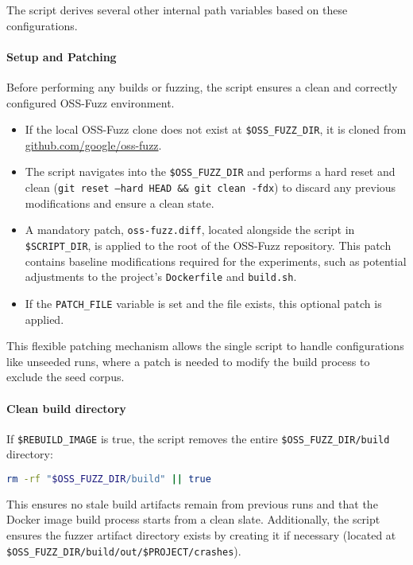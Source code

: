 \documentclass[11pt,a4paper,twocolumn]{article}
\begin{document}
The script derives several other internal path variables based on these configurations.

\noindent \paragraph{Setup and Patching} \label{sec:methodology_setup_patching}

Before performing any builds or fuzzing, the script ensures a clean and correctly configured OSS-Fuzz environment.

\begin{itemize}
	\item If the local OSS-Fuzz clone does not exist at \texttt{\$OSS\_FUZZ\_DIR}, it is cloned from \href{https://github.com/google/oss-fuzz.git}{github.com/google/oss-fuzz}.
	\item The script navigates into the \texttt{\$OSS\_FUZZ\_DIR} and performs a hard reset and clean (\texttt{git reset --hard HEAD \&\& git clean -fdx}) to discard any previous modifications and ensure a clean state.
	\item A mandatory patch, \texttt{oss-fuzz.diff}, located alongside the script in \texttt{\$SCRIPT\_DIR}, is applied to the root of the OSS-Fuzz repository. This patch contains baseline modifications required for the experiments, such as potential adjustments to the project's \texttt{Dockerfile} and \texttt{build.sh}.
	\item If the \texttt{PATCH\_FILE} variable is set and the file exists, this optional patch is applied.
\end{itemize}

This flexible patching mechanism allows the single script to handle configurations like unseeded runs, where a patch is needed to modify the build process to exclude the seed corpus.

\noindent \paragraph{Clean build directory} \label{sec:methodology_clean} If \texttt{\$REBUILD\_IMAGE} is true, the script removes the entire \texttt{\$OSS\_FUZZ\_DIR/build} directory:
\begin{lstlisting}[language=bash, caption={Bash script to clean the OSS-Fuzz build directory with error handling}]
rm -rf "$OSS_FUZZ_DIR/build" || true
\end{lstlisting}

This ensures no stale build artifacts remain from previous runs and that the Docker image build process starts from a clean slate. Additionally, the script ensures the fuzzer artifact directory exists by creating it if necessary (located at \texttt{\$OSS\_FUZZ\_DIR/build/out/\$PROJECT/crashes}).
\end{document}
